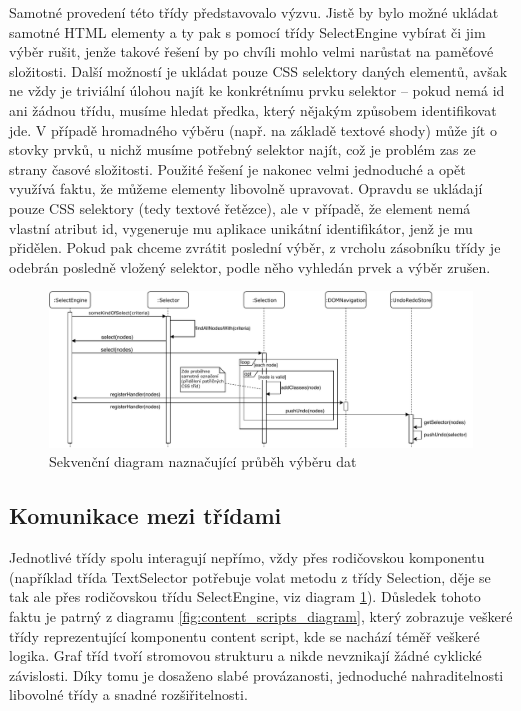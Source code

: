 \documentclass[thesis=B,czech]{FITthesis}[2012/06/26]
\begin{document}
\begin{description}
	Samotné provedení této třídy představovalo výzvu. Jistě by bylo možné ukládat samotné HTML elementy a ty pak s pomocí třídy SelectEngine vybírat či jim výběr rušit, jenže takové řešení by po chvíli mohlo velmi narůstat na paměťové složitosti. Další možností je ukládat pouze CSS selektory daných elementů, avšak ne vždy je triviální úlohou najít ke konkrétnímu prvku selektor -- pokud nemá \textsf{id} ani žádnou třídu, musíme hledat předka, který nějakým způsobem identifikovat jde. V případě hromadného výběru (např. na základě textové shody) může jít o stovky prvků, u nichž musíme potřebný selektor najít, což je problém zas ze strany časové složitosti. Použité řešení je nakonec velmi jednoduché a opět využívá faktu, že můžeme elementy libovolně upravovat. Opravdu se ukládají pouze CSS selektory (tedy textové řetězce), ale v případě, že element nemá vlastní atribut \textsf{id}, vygeneruje mu aplikace unikátní identifikátor, jenž je mu přidělen. Pokud pak chceme zvrátit poslední výběr, z vrcholu zásobníku třídy je odebrán posledně vložený selektor, podle něho vyhledán prvek a výběr zrušen.
\end{description}

\begin{figure}
	\includegraphics[width=\linewidth]{images/sequence_diagram.pdf}
	\caption{Sekvenční diagram naznačující průběh výběru dat}
	\label{fig:sequence_diagram}
\end{figure}

\subsection{Komunikace mezi třídami}
Jednotlivé třídy spolu interagují nepřímo, vždy přes rodičovskou komponentu (například třída TextSelector potřebuje volat metodu z třídy Selection, děje se tak ale přes rodičovskou třídu SelectEngine, viz diagram \ref{fig:sequence_diagram}). Důsledek tohoto faktu je patrný z diagramu \ref{fig:content_scripts_diagram}, který zobrazuje veškeré třídy reprezentující komponentu content script, kde se nachází téměř veškeré logika. Graf tříd tvoří stromovou strukturu a nikde nevznikají žádné cyklické závislosti. Díky tomu je dosaženo slabé provázanosti, jednoduché nahraditelnosti libovolné třídy a snadné rozšiřitelnosti.
\end{document}
